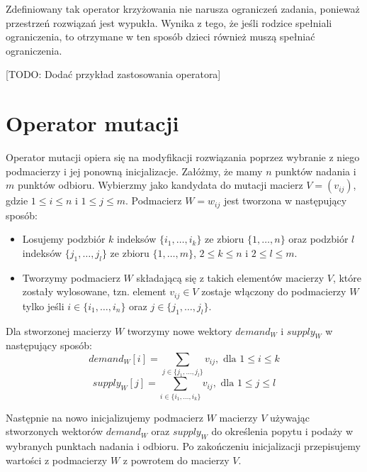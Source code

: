 Zdefiniowany tak operator krzyżowania nie narusza ograniczeń zadania, ponieważ przestrzeń rozwiązań jest wypukła. Wynika z tego, że jeśli 
rodzice spełniali ograniczenia, to otrzymane w ten sposób dzieci również muszą spełniać ograniczenia.

[TODO: Dodać przykład zastosowania operatora]

\section{Operator mutacji}
Operator mutacji opiera się na modyfikacji rozwiązania poprzez wybranie z niego podmacierzy i jej ponowną inicjalizacje. Załóżmy, że 
mamy $n$ punktów nadania i $m$ punktów odbioru. Wybierzmy jako kandydata do mutacji macierz $V = (v_{ij})$, gdzie $1 \le i \le n$ i 
$1 \le j \le m$. Podmacierz $W = w_{ij}$ jest tworzona w następujący sposób:

\begin{itemize}
    \item Losujemy podzbiór $k$ indeksów $\{i_1, \dots, i_k\}$ ze zbioru $\{1, \dots, n\}$ oraz podzbiór $l$ indeksów $\{j_1, \dots, j_l\}$ 
    ze zbioru $\{1, \dots, m\}$, $2 \le k \le n$ i $2 \le l \le m$.
    \item Tworzymy podmacierz $W$ składającą się z takich elementów macierzy $V$, które zostały wylosowane, tzn. element $v_{ij} \in V$ 
    zostaje włączony do podmacierzy $W$ tylko jeśli $i \in \{i_1, \dots, i_n\}$ oraz $j \in \{j_1, \dots, j_l\}$.
\end{itemize}

Dla stworzonej macierzy $W$ tworzymy nowe wektory $demand_W$ i $supply_W$ w następujący sposób:
$$demand_W[i] = \sum_{j \in \{j_1, \dots, j_l\}} v_{ij}, \text{ dla } 1 \le i \le k$$
$$supply_W[j] = \sum_{i \in \{i_1, \dots, i_k\}} v_{ij}, \text{ dla } 1 \le j \le l$$

Następnie na nowo inicjalizujemy podmacierz $W$ macierzy $V$ używając stworzonych wektorów $demand_W$ oraz $supply_W$ do określenia popytu i podaży
w wybranych punktach nadania i odbioru. Po zakończeniu inicjalizacji przepisujemy wartości z podmacierzy $W$ z powrotem do macierzy $V$.


